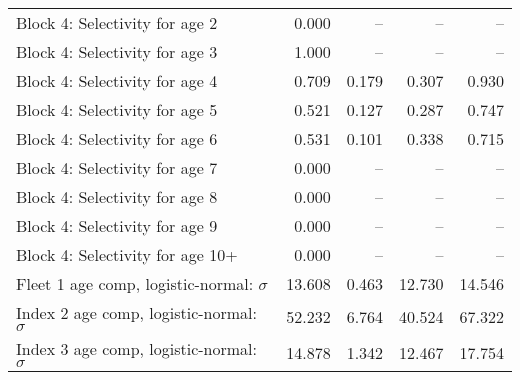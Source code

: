 \documentclass[
]{article}
\begin{document}
\begin{landscape}
\begin{longtable}[t]{lrrrr}
Block 4: Selectivity for age 2 & 0.000 & -- & -- & --\\
Block 4: Selectivity for age 3 & 1.000 & -- & -- & --\\
Block 4: Selectivity for age 4 & 0.709 & 0.179 & 0.307 & 0.930\\
Block 4: Selectivity for age 5 & 0.521 & 0.127 & 0.287 & 0.747\\
\addlinespace
Block 4: Selectivity for age 6 & 0.531 & 0.101 & 0.338 & 0.715\\
Block 4: Selectivity for age 7 & 0.000 & -- & -- & --\\
Block 4: Selectivity for age 8 & 0.000 & -- & -- & --\\
Block 4: Selectivity for age 9 & 0.000 & -- & -- & --\\
Block 4: Selectivity for age 10+ & 0.000 & -- & -- & --\\
\addlinespace
Fleet 1 age comp, logistic-normal: $\sigma$ & 13.608 & 0.463 & 12.730 & 14.546\\
Index 2 age comp, logistic-normal: $\sigma$ & 52.232 & 6.764 & 40.524 & 67.322\\
Index 3 age comp, logistic-normal: $\sigma$ & 14.878 & 1.342 & 12.467 & 17.754\\*
\end{longtable}
\end{landscape}
\end{document}
